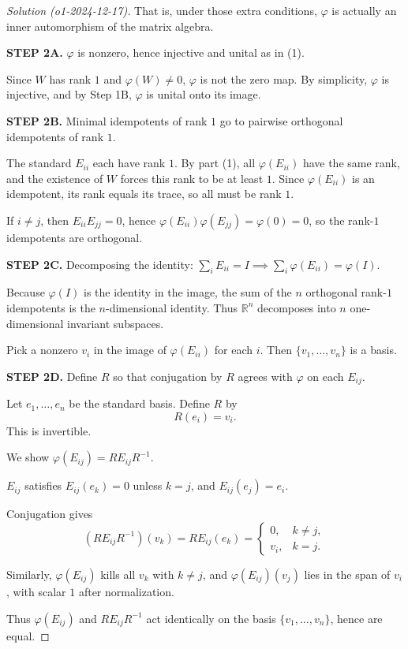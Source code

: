 \documentclass[11pt]{article}
\numberwithin{equation}{section}
\begin{document}
\begin{proof}[Solution (o1-2024-12-17)]
That is, under those extra conditions, $\varphi$ is actually an inner automorphism of the matrix algebra.

\textbf{STEP 2A.} $\varphi$ is nonzero, hence injective and unital as in (1).

Since $W$ has rank $1$ and $\varphi(W)\neq 0$, $\varphi$ is not the zero map.  By simplicity, $\varphi$ is injective, and by Step 1B, $\varphi$ is unital onto its image.

\textbf{STEP 2B.} Minimal idempotents of rank $1$ go to pairwise orthogonal idempotents of rank $1$.

The standard $E_{ii}$ each have rank $1$.  By part (1), all $\varphi(E_{ii})$ have the same rank, and the existence of $W$ forces this rank to be at least $1$.  Since $\varphi(E_{ii})$ is an idempotent, its rank equals its trace, so all must be rank $1$.

If $i\neq j$, then $E_{ii} E_{jj}=0$, hence $\varphi(E_{ii})\varphi(E_{jj})=\varphi(0)=0$, so the rank-$1$ idempotents are orthogonal.

\textbf{STEP 2C.} Decomposing the identity: $\sum_i E_{ii}=I \implies \sum_i \varphi(E_{ii})=\varphi(I)$.

Because $\varphi(I)$ is the identity in the image, the sum of the $n$ orthogonal rank-$1$ idempotents is the $n$-dimensional identity.  Thus $\mathbb{R}^n$ decomposes into $n$ one-dimensional invariant subspaces.

Pick a nonzero $v_i$ in the image of $\varphi(E_{ii})$ for each $i$.  
Then $\{v_1,\dots,v_n\}$ is a basis.

\textbf{STEP 2D.} Define $R$ so that conjugation by $R$ agrees with $\varphi$ on each $E_{ij}$.

Let $e_1,\dots,e_n$ be the standard basis.  
Define $R$ by
\[
R(e_i)=v_i.
\]
This is invertible.

We show $\varphi(E_{ij})=R E_{ij} R^{-1}$.

$E_{ij}$ satisfies $E_{ij}(e_k)=0$ unless $k=j$, and $E_{ij}(e_j)=e_i$.

Conjugation gives
\[
(R E_{ij} R^{-1})(v_k)=R E_{ij}(e_k)=
\begin{cases}
0, & k\neq j,\\
v_i, & k=j.
\end{cases}
\]

Similarly, $\varphi(E_{ij})$ kills all $v_k$ with $k\neq j$, and $\varphi(E_{ij})(v_j)$ lies in the span of $v_i$, with scalar $1$ after normalization.

Thus $\varphi(E_{ij})$ and $R E_{ij} R^{-1}$ act identically on the basis $\{v_1,\dots,v_n\}$, hence are equal.


\end{proof}
\end{document}
